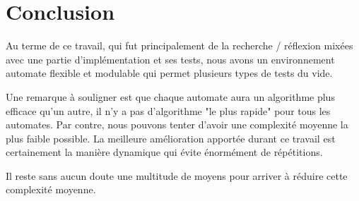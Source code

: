 \section{Conclusion}
\par
Au terme de ce travail, qui fut principalement de la recherche / réflexion mixées avec une partie d'implémentation et ses tests, nous avons un environnement automate flexible et modulable qui permet plusieurs types de tests du vide.\par
Une remarque à souligner est que chaque automate aura un algorithme plus efficace qu'un autre, il n'y a pas d'algorithme "le plus rapide" pour tous les automates. Par contre, nous pouvons tenter d'avoir une complexité moyenne la plus faible possible. La meilleure amélioration apportée durant ce travail est certainement la manière dynamique qui évite énormément de répétitions.\par
Il reste sans aucun doute une multitude de moyens pour arriver à réduire cette complexité moyenne.\par
\par
